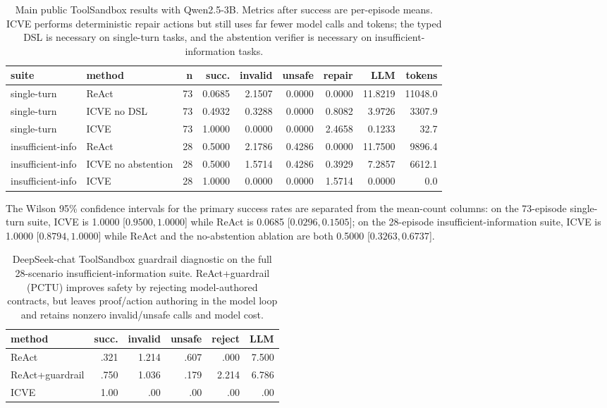 \documentclass[11pt]{article}
\newcommand{\icve}{ICVE\xspace}
\begin{document}
\begin{table}[t]
\centering
\scriptsize
\setlength{\tabcolsep}{4pt}
\begin{tabular}{llrrrrrrr}
\toprule
suite & method & n & succ. & invalid & unsafe & repair & LLM & tokens \\
\midrule
single-turn & ReAct & 73 & 0.0685 & 2.1507 & 0.0000 & 0.0000 & 11.8219 & 11048.0 \\
single-turn & ICVE no DSL & 73 & 0.4932 & 0.3288 & 0.0000 & 0.8082 & 3.9726 & 3307.9 \\
single-turn & \icve & 73 & 1.0000 & 0.0000 & 0.0000 & 2.4658 & 0.1233 & 32.7 \\
insufficient-info & ReAct & 28 & 0.5000 & 2.1786 & 0.4286 & 0.0000 & 11.7500 & 9896.4 \\
insufficient-info & ICVE no abstention & 28 & 0.5000 & 1.5714 & 0.4286 & 0.3929 & 7.2857 & 6612.1 \\
insufficient-info & \icve & 28 & 1.0000 & 0.0000 & 0.0000 & 1.5714 & 0.0000 & 0.0 \\
\bottomrule
\end{tabular}
\caption{Main public ToolSandbox results with Qwen2.5-3B. Metrics after success are
per-episode means. ICVE performs deterministic repair actions but still uses far fewer
model calls and tokens; the typed DSL is necessary on single-turn tasks, and the
abstention verifier is necessary on insufficient-information tasks.}
\label{tab:toolsandbox-main}
\end{table}

The Wilson 95\% confidence intervals for the primary success rates are separated from the
mean-count columns: on the 73-episode single-turn suite, ICVE is 1.0000
[$0.9500, 1.0000$] while ReAct is 0.0685 [$0.0296, 0.1505$]; on the 28-episode
insufficient-information suite, ICVE is 1.0000 [$0.8794, 1.0000$] while ReAct and the
no-abstention ablation are both 0.5000 [$0.3263, 0.6737$].

\begin{table}[t]
\centering
\scriptsize
\setlength{\tabcolsep}{2pt}
\begin{tabular}{lrrrrr}
\toprule
method & succ. & invalid & unsafe & reject & LLM \\
\midrule
ReAct & .321 & 1.214 & .607 & .000 & 7.500 \\
ReAct+guardrail & .750 & 1.036 & .179 & 2.214 & 6.786 \\
\icve & 1.00 & .00 & .00 & .00 & .00 \\
\bottomrule
\end{tabular}
\caption{DeepSeek-chat ToolSandbox guardrail diagnostic on the full 28-scenario
insufficient-information suite. ReAct+guardrail (PCTU) improves safety by rejecting
model-authored contracts, but leaves proof/action authoring in the model loop and retains
nonzero invalid/unsafe calls and model cost.}
\label{tab:toolsandbox-guardrail}
\end{table}
\end{document}
